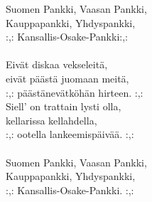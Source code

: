 
Suomen Pankki, Vaasan Pankki, \\ Kauppapankki, Yhdyspankki, \\ :,: Kansallis-Osake-Pankki:,: \\ \hspace{10mm} \\ Eivät diskaa vekseleitä, \\ eivät päästä juomaan meitä, \\ :,: päästänevätköhän hirteen. :,: \\ Siell' on trattain lysti olla, \\ kellarissa kellahdella, \\ :,: ootella lankeemispäivää. :,: \\ \hspace{10mm} \\ Suomen Pankki, Vaasan Pankki, \\ Kauppapankki, Yhdyspankki, \\ :,: Kansallis-Osake-Pankki. :,: